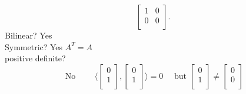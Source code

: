 \documentclass{report}
\begin{document}
\begin{enumerate} [label=(\alph*)]
\[\begin{bmatrix}
     1 & 0\\
     0 & 0\\
     \end{bmatrix} 
     .\] 
     Bilinear? Yes\\
     Symmetric? Yes $ A^{T}=A$ \\
     positive definite?\\
     \[
     \text{ No } \qquad  \langle  \begin{bmatrix}
     0\\
     1\\
     \end{bmatrix}
     , \begin{bmatrix}
     0\\
     1\\
     \end{bmatrix}
       \rangle =0  \quad \text{ but } \begin{bmatrix}
       0\\
       1\\
       \end{bmatrix}
        \neq \begin{bmatrix}
        0\\
        0\\
        \end{bmatrix}
        
\]
\end{enumerate}
\end{document}
